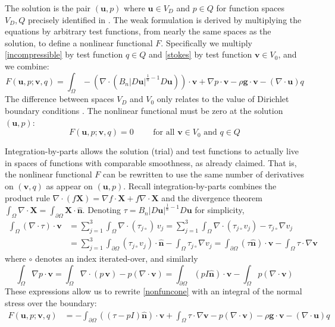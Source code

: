 \documentclass[letterpaper,final,12pt,reqno]{amsart}
\newcommand{\grad}{\nabla}
\newcommand{\hbn}{\hat{\mathbf{n}}}
\newcommand{\bu}{\mathbf{u}}
\newcommand{\bv}{\mathbf{v}}
\newcommand{\bX}{\mathbf{X}}
\begin{document}
The solution is the pair $(\bu,p)$ where $\bu\in V_D$ and $p \in Q$ for function spaces $V_D,Q$ precisely identified in \cite{JouvetRappaz2011}.  The weak formulation is derived by multiplying the equations by arbitrary test functions, from nearly the same spaces as the solution, to define a nonlinear functional $F$.  Specifically we multiply \eqref{incompressible} by test function $q\in Q$ and \eqref{stokes} by test function $\bv\in V_0$, and we combine:
\begin{equation}
F(\bu,p;\bv,q) = \int_\Omega - \left(\nabla \cdot \left(B_n |D\bu|^{\frac{1}{n} - 1} D\bu\right)\right)\cdot \bv + \nabla p \cdot \bv - \rho \mathbf{g} \cdot \bv - \left(\nabla \cdot \bu\right) q \label{nonfuncone}
\end{equation}
The difference between spaces $V_D$ and $V_0$ only relates to the value of Dirichlet boundary conditions \cite{JouvetRappaz2011}.  The nonlinear functional must be zero at the solution $(\bu,p)$:
\begin{equation}
F(\bu,p;\bv,q) = 0 \qquad \text{ for all } \bv\in V_0 \text{ and } q\in Q
\end{equation}

Integration-by-parts allows the solution (trial) and test functions to actually live in spaces of functions with comparable smoothness, as already claimed.  That is, the nonlinear functional $F$ can be rewritten to use the same number of derivatives on $(\bv,q)$ as appear on $(\bu,p)$.  Recall integration-by-parts combines the product rule $\nabla \cdot(f\bX) = \grad f\cdot \bX + f \nabla \cdot \bX$ and the divergence theorem $\int_\Omega \nabla \cdot \bX = \int_{\partial \Omega} \bX \cdot \hbn$.  Denoting $\tau = B_n |D\bu|^{\frac{1}{n} - 1} D\bu$ for simplicity,
\begin{align*}
\int_\Omega \left(\nabla \cdot \tau\right)\cdot \bv &= \sum_{j=1}^3 \int_\Omega \nabla \cdot (\tau_{j\circ})\, v_j = \sum_{j=1}^3 \int_\Omega \nabla \cdot (\tau_{j\circ} v_j) - \tau_{j\circ} \nabla v_j \\
  &= \sum_{j=1}^3 \int_{\partial \Omega} (\tau_{j\circ} v_j) \cdot \hbn - \int_\Omega \tau_{j\circ} \nabla v_j = \int_{\partial \Omega} (\tau \hbn)\cdot \bv - \int_\Omega \tau \cdot \nabla \bv
\end{align*}
where $\circ$ denotes an index iterated-over, and similarly
    $$\int_\Omega \nabla p \cdot \bv = \int_\Omega \nabla\cdot (p\,\bv) - p (\nabla \cdot \bv) = \int_{\partial \Omega} (p I\hbn)\cdot \bv - \int_\Omega p (\nabla \cdot \bv)$$
These expressions allow us to rewrite \eqref{nonfuncone} with an integral of the normal stress over the boundary:
\begin{align}
F(\bu,p;\bv,q) &= -\int_{\partial\Omega} ((\tau-pI) \hbn)\cdot \bv + \int_\Omega \tau \cdot \nabla \bv - p (\nabla \cdot \bv) - \rho \mathbf{g} \cdot \bv - \left(\nabla \cdot \bu\right) q \label{nonfunctwo}
\end{align}
\end{document}
